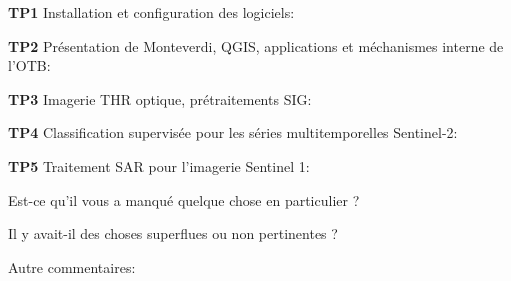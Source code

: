 \documentclass[10pt,a4paper]{article}
\begin{document}
\textbf{TP1} Installation et configuration des logiciels:
\moduleanswer

\textbf{TP2} Présentation de Monteverdi, QGIS, applications et méchanismes interne de l'OTB:
\moduleanswer

\textbf{TP3} Imagerie THR optique, prétraitements SIG:
\moduleanswer

\textbf{TP4} Classification supervisée pour les séries multitemporelles Sentinel-2:
\moduleanswer

\textbf{TP5} Traitement SAR pour l'imagerie Sentinel 1:
\moduleanswer

Est-ce qu'il vous a manqué quelque chose en particulier ?
\vspace{6em}

Il y avait-il des choses superflues ou non pertinentes ?
\vspace{6em}

Autre commentaires:
\end{document}
